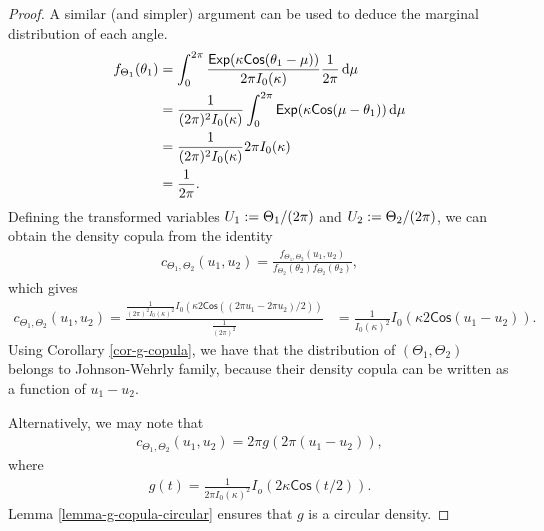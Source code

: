 \documentclass[oneside,11pt]{article}
\begin{document}
\begin{proof}
    A similar (and simpler) argument can be used to deduce the marginal distribution of each angle.
    \begin{align*}
        f_{\Theta_1}(\theta_1) &= \int_{0}^{2 \pi} \frac{\mathsf{Exp}(\kappa \mathsf{Cos}(\theta_1 - \mu))}{2 \pi I_0(\kappa)} \frac{1}{2 \pi} \,\mathrm{d} \mu \\
        &= \frac{1}{(2 \pi)^2 I_0(\kappa)} \int_{0}^{2 \pi} \mathsf{Exp}(\kappa \mathsf{Cos}(\mu - \theta_1)) \,\mathrm{d} \mu \\
        &= \frac{1}{(2 \pi)^2 I_0(\kappa)} 2\pi I_0(\kappa) \\
        &= \frac{1}{2\pi}.
    \end{align*}
    Defining the transformed variables $U_1 := \Theta_1/(2\pi)$ and $U_2 := \Theta_2/(2\pi)$, we can obtain the density copula from the identity
    \begin{align*}
        c_{\Theta_1, \Theta_2}(u_1,u_2) = \frac{f_{\Theta_1, \Theta_2}(u_1,u_2)}{f_{\Theta_2}(\theta_2) f_{\Theta_2}(\theta_2)},
    \end{align*}
    which gives
    \begin{align*}
         c_{\Theta_1, \Theta_2}(u_1,u_2) = \frac{\frac{1}{(2 \pi)^2 I_0(\kappa)^2} I_0(\kappa 2  \mathsf{Cos}((2\pi u_1 - 2\pi u_2)/2))}{\frac{1}{(2\pi)^2}} &= \frac{1}{I_0(\kappa)^2} I_0(\kappa 2  \mathsf{Cos}(u_1-u_2)).
    \end{align*}
    Using Corollary \ref{cor-g-copula}, we have that the distribution of $(\Theta_1, \Theta_2)$ belongs to Johnson-Wehrly family, because their density copula can be written as a function of $u_1 - u_2$.

    Alternatively, we may note that
    \begin{align*}
        c_{\Theta_1, \Theta_2}(u_1,u_2) =  2 \pi g(2 \pi (u_1-u_2)),
    \end{align*}
    where
    \begin{align*}
        g(t) = \frac{1}{2\pi I_0(\kappa)^2} I_o(2\kappa \mathsf{Cos}(t/2)).
    \end{align*}
    Lemma \ref{lemma-g-copula-circular} ensures that $g$ is a circular density.
\end{proof}
\end{document}
